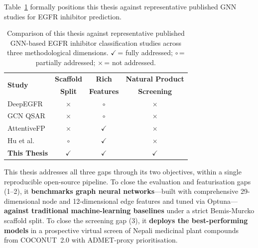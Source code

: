\noindent Table~\ref{tab:gap_compare} formally positions this thesis against
representative published GNN studies for EGFR inhibitor prediction.

\begin{table}[H]
\centering
\caption{Comparison of this thesis against representative published GNN-based
         EGFR inhibitor classification studies across three methodological dimensions.
         $\checkmark$\,= fully addressed; $\circ$\,= partially addressed;
         $\times$\,= not addressed.}
\label{tab:gap_compare}
{\singlespacing
\begin{tabular}{lccc}
\toprule
\multirow{2}{*}{\textbf{Study}} &
\textbf{Scaffold} & \textbf{Rich} & \textbf{Natural Product} \\
& \textbf{Split} & \textbf{Features} & \textbf{Screening} \\
\midrule
DeepEGFR \parencite{malik2025deepegfr}      & $\times$ & $\circ$ & $\times$ \\
GCN QSAR \parencite{jiang2021gnn}           & $\times$ & $\circ$ & $\times$ \\
AttentiveFP \parencite{xiong2020attentivefp} & $\times$ & $\checkmark$ & $\times$ \\
Hu et al. \parencite{hu2020strategies}      & $\circ$  & $\checkmark$ & $\times$ \\
\textbf{This Thesis}                        & $\checkmark$ & $\checkmark$ & $\checkmark$ \\
\bottomrule
\end{tabular}
}
\end{table}

This thesis addresses all three gaps through its two objectives, within a single
reproducible open-source pipeline. To close the evaluation and featurisation gaps
(1--2), it \textbf{benchmarks graph neural networks}---built with comprehensive
29-dimensional node and 12-dimensional edge features and tuned via Optuna---%
\textbf{against traditional machine-learning baselines} under a strict Bemis-Murcko
scaffold split. To close the screening gap (3), it \textbf{deploys the best-performing
models} in a prospective virtual screen of Nepali medicinal plant compounds from
COCONUT~2.0 with ADMET-proxy prioritisation.